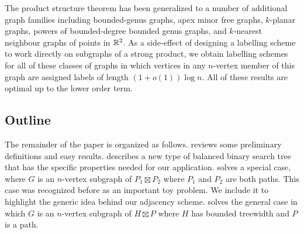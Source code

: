 \documentclass[kpfonts]{patmorin}
\begin{document}
The product structure theorem has been generalized to a number of additional graph families including bounded-genus graphs, apex minor free graphs, $k$-planar graphs, powers of bounded-degree bounded genus graphs, and $k$-nearest neighbour graphs of points in $\mathbb{R}^2$. As a side-effect of designing a labelling scheme to work directly on subgraphs of a strong product, we obtain labelling schemes for all of these classes of graphs in which vertices in any $n$-vertex member of this graph are assigned labels of length $(1+o(1))\log n$.  All of these results are optimal up to the lower order term.

\subsection{Outline}

The remainder of the paper is organized as follows.  reviews some preliminary definitions and easy results.   describes a new type of balanced binary search tree that has the specific properties needed for our application.  solves a special case, where $G$ is an $n$-vertex subgraph of $P_1\boxtimes P_2$ where $P_1$ and $P_2$ are both paths.  
This case was recognized before as an important toy problem. We include it to highlight the generic idea behind our adjacency scheme.  solves the general case in which $G$ is an $n$-vertex subgraph of $H\boxtimes P$ where $H$ has bounded treewidth and $P$ is a path.  

% 
% 
% 
\end{document}
